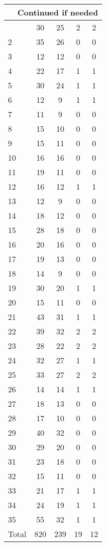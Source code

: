 \begin{center}
\begin{longtable}{l|c|c|c|c}
\hline \multicolumn{5}{|r|}{{Continued if needed}} \\ \hline
\endfoot 
1 & 30 & 25 & 2 & 2\\ \hline
2 & 35 & 26 & 0 & 0\\ \hline
3 & 12 & 12 & 0 & 0\\ \hline
4 & 22 & 17 & 1 & 1\\ \hline
5 & 30 & 24 & 1 & 1\\ \hline
6 & 12 & 9 & 1 & 1\\ \hline
7 & 11 & 9 & 0 & 0\\ \hline
8 & 15 & 10 & 0 & 0\\ \hline
9 & 15 & 11 & 0 & 0\\ \hline
10 & 16 & 16 & 0 & 0\\ \hline
11 & 19 & 11 & 0 & 0\\ \hline
12 & 16 & 12 & 1 & 1\\ \hline
13 & 12 & 9 & 0 & 0\\ \hline
14 & 18 & 12 & 0 & 0\\ \hline
15 & 28 & 18 & 0 & 0\\ \hline
16 & 20 & 16 & 0 & 0\\ \hline
17 & 19 & 13 & 0 & 0\\ \hline
18 & 14 & 9 & 0 & 0\\ \hline
19 & 30 & 20 & 1 & 1\\ \hline
20 & 15 & 11 & 0 & 0\\ \hline
21 & 43 & 31 & 1 & 1\\ \hline
22 & 39 & 32 & 2 & 2\\ \hline
23 & 28 & 22 & 2 & 2\\ \hline
24 & 32 & 27 & 1 & 1\\ \hline
25 & 33 & 27 & 2 & 2\\ \hline
26 & 14 & 14 & 1 & 1\\ \hline
27 & 18 & 13 & 0 & 0\\ \hline
28 & 17 & 10 & 0 & 0\\ \hline
29 & 40 & 32 & 0 & 0\\ \hline
30 & 29 & 20 & 0 & 0\\ \hline
31 & 23 & 18 & 0 & 0\\ \hline
32 & 15 & 11 & 0 & 0\\ \hline
33 & 21 & 17 & 1 & 1\\ \hline
34 & 24 & 19 & 1 & 1\\ \hline
35 & 55 & 32 & 1 & 1\\ \hline
\hline \hline
Total & 820 & 239 & 19 & 12



\end{longtable}
\end{center}

